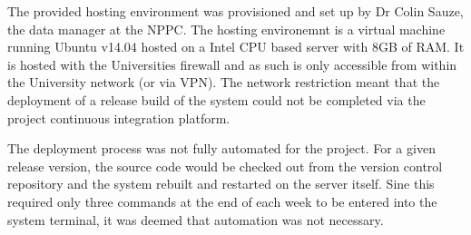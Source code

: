 The provided hosting environment was provisioned and set up by Dr Colin Sauze, the data manager at the NPPC. The hosting environemnt is a virtual machine running Ubuntu v14.04 hosted on a Intel CPU based server with 8GB of RAM. It is hosted with the Universities firewall and as such is only accessible from within the University network (or via VPN). The network restriction meant that the deployment of a release build of the system could not be completed via the project continuous integration platform. 

The deployment process was not fully automated for the project. For a given release version, the source code would be checked out from the version control repository and the system rebuilt and restarted on the server itself. Sine this required only three commands at the end of each week to be entered into the system terminal, it was deemed that automation was not necessary.
